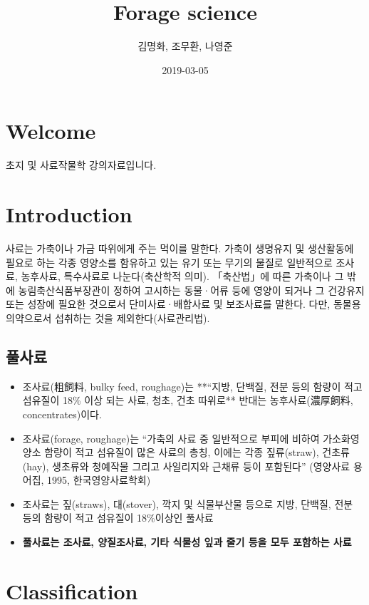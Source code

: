 \documentclass[]{book}
\title{Forage science}
\author{김명화, 조무환, 나영준}
\date{2019-03-05}
\begin{document}
\maketitle

{
\setcounter{tocdepth}{1}
\tableofcontents
}
\chapter*{Welcome}\label{welcome}

초지 및 사료작물학 강의자료입니다.

\chapter{Introduction}\label{intro}

사료는 가축이나 가금 따위에게 주는 먹이를 말한다. 가축이 생명유지 및
생산활동에 필요로 하는 각종 영양소를 함유하고 있는 유기 또는 무기의
물질로 일반적으로 조사료, 농후사료, 특수사료로 나눈다(축산학적 의미).
「축산법」에 따른 가축이나 그 밖에 농림축산식품부장관이 정하여 고시하는
동물·어류 등에 영양이 되거나 그 건강유지 또는 성장에 필요한 것으로서
단미사료·배합사료 및 보조사료를 말한다. 다만, 동물용의약으로서 섭취하는
것을 제외한다(사료관리법).

\section{풀사료}

\begin{itemize}
\item
  조사료(粗飼料, bulky feed, roughage)는 **``지방, 단백질, 전분 등의
  함량이 적고 섬유질이 18\% 이상 되는 사료, 청초, 건초 따위로** 반대는
  농후사료(濃厚飼料, concentrates)이다.
\item
  조사료(forage, roughage)는 ``가축의 사료 중 일반적으로 부피에 비하여
  가소화영양소 함량이 적고 섬유질이 많은 사료의 총칭, 이에는 각종
  짚류(straw), 건초류(hay), 생초류와 청예작물 그리고 사일리지와 근채류
  등이 포함된다'' (영양사료 용어집, 1995, 한국영양사료학회)
\item
  조사료는 짚(straws), 대(stover), 깍지 및 식물부산물 등으로 지방,
  단백질, 전분 등의 함량이 적고 섬유질이 18\%이상인 풀사료
\item
  \textbf{풀사료는 조사료, 양질조사료, 기타 식물성 잎과 줄기 등을 모두
  포함하는 사료}
\end{itemize}

\chapter{Classification}\label{classification}
\end{document}
